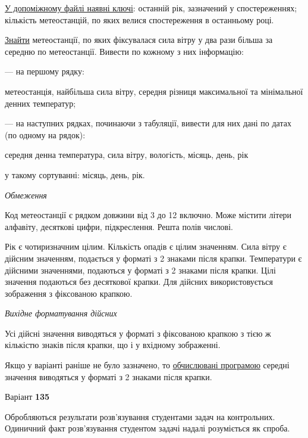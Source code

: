 \documentclass[11pt, ukrainian]{article}
\begin{document}
\underline{У допоміжному файлі наявні ключі}: останній рік, зазначений у спостереженнях; кількість метеостанцій, по яких велися спостереження в останньому році.

\underline{Знайти} метеостанції, по яких фіксувалася сила вітру у два рази більша за середню по метеостанції. Вивести по кожному з них інформацію:\par
{\noindent}--- на першому рядку:\par
метеостанція, найбільша сила вітру, середня різниця максимальної та мінімальної денних температур;

{\noindent}--- на наступних рядках, починаючи з табуляції, вивести для них дані по датах (по одному на рядок):\par
середня денна температура, сила вітру, вологість, місяць, день, рік

{\noindent}у такому сортуванні: місяць, день, рік.


\bigskip\textit{Обмеження}

Код метеостанції є рядком довжини від 3 до 12 включно.
Може містити літери алфавіту, десяткові цифри, підкреслення. Решта полів числові.

Рік є чотиризначним цілим.
Кількість опадів є цілим значенням.
Сила вітру є дійсним значенням, подається у форматі з 2 знаками після крапки.
Температури є дійсними значеннями, подаються у форматі з 2 знаками після крапки.
Цілі значення подаються без десяткової крапки.
Для дійсних використовується зображення з фіксованою крапкою.

\textit{Вихідне форматування дійсних}

Усі дійсні значення виводяться у форматі з фіксованою крапкою з тією ж кількістю знаків після крапки, що і у вхідному зображенні.

Якщо у варіанті раніше не було зазначено, то \underline{обчислювані програмою} середні значення виводяться у форматі з 2 знаками після крапки.




\par
\newpage
{\center Варіант  \No \textbf { 135 }\par}
\bigskip
Обробляються результати розв’язування студентами задач на контрольних.
Одиничний факт роз\-в’я\-зу\-вання студентом задачі надалі розуміється як спроба.
\end{document}
